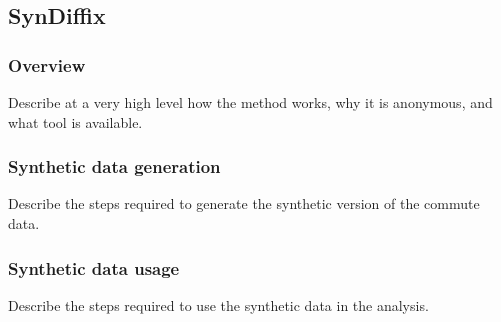 \subsection{SynDiffix}
\label{sec:method_sdx}


\subsubsection{Overview}

Describe at a very high level how the method works, why it is anonymous, and what tool is available.

\subsubsection{Synthetic data generation}

Describe the steps required to generate the synthetic version of the commute data.

\subsubsection{Synthetic data usage}

Describe the steps required to use the synthetic data in the analysis.
